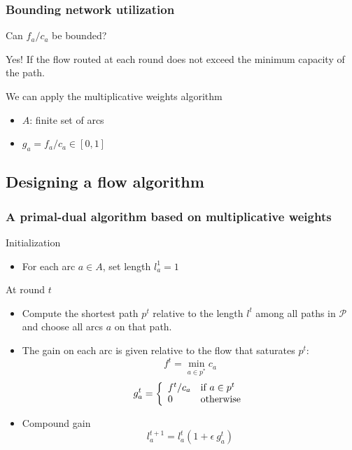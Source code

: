 \documentclass{beamer}
\begin{document}
\begin{frame}
    \frametitle{Bounding network utilization}

    Can $f_a / c_a$ be bounded?
    \begin{block}{Yes!}
        If the flow routed at each round does not exceed the minimum capacity
        of the path.
    \end{block}

    \begin{block}{We can apply the multiplicative weights algorithm}
        \begin{itemize}
            \item $A$: finite set of arcs
            \item $g_a = f_a / c_a \in [0,1]$
        \end{itemize}
    \end{block}

\end{frame}

\subsection{Designing a flow algorithm}
\begin{frame}
    \frametitle{A primal-dual algorithm based on multiplicative weights}

    \begin{block}{Initialization}
        \begin{itemize} \item
            For each arc $a\in A$, set length $l_a^1 = 1$
        \end{itemize}
    \end{block}
    \begin{block}{At round $t$}
        \begin{itemize}
        \item Compute the shortest path $p^t$ relative to the length $l^t$
            among all paths in $\mathcal{P}$ and choose all arcs $a$ on that
            path.
        \item The gain on each arc is given relative to the flow that saturates
             $p^t$:
            \begin{equation*}
            f^t = \min_{a\in p^*} c_a
            \end{equation*}
            \begin{equation*}
                g_a^t = \left\{
        \begin{array}{l l}
        f^t/c_a & \text{if $a \in p^t$}\\
        0 & \text{otherwise}
        \end{array}
        \right.
            \end{equation*}

        \item Compound gain
            \begin{equation*}
            l_a^{t+1} = l_a^t (1 + \epsilon~g_a^t)
            \end{equation*}
        \end{itemize}
    \end{block}

\end{frame}
\end{document}
